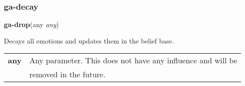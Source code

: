 \subsubsection{ga-decay}

\textbf{ga-drop}(any \emph{any})

Decays all emotions and updates them in the belief base.\\

\begin{tabular}{l l}
	\textbf{any} & Any parameter. This does not have any influence and will be \\
	& removed in the future. 
\end{tabular}